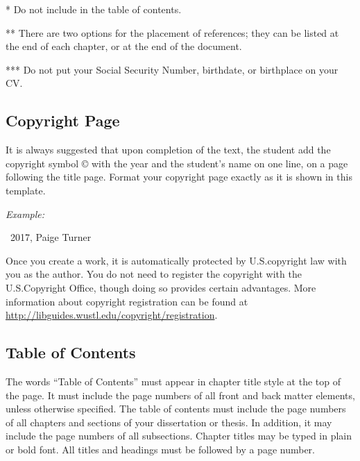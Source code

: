 \begin{table}
\begin{threeparttable}[b]
  \vspace{.5em}
  \begin{tablenotes}
    \footnotesize
    \item[*] Do not include in the table of contents.
    \item[**] There are two options for the placement of references; they can be listed at the end of each chapter, or at the end of the document.
    \item[***] Do not put your Social Security Number, birthdate, or birthplace on your CV.
  \end{tablenotes}
  \end{threeparttable}
\end{table}

\subsection{Copyright Page}

It is always suggested that upon completion of the text, the student add the copyright symbol © with the year and the student's name on one line, on a page following the title page.
Format your copyright page exactly as it is shown in this template.

\vspace{\onelineskip}
\noindent
\textit{Example:}

\centerline{\textcopyright\ 2017, Paige Turner}
\vspace{\onelineskip}

Once you create a work, it is automatically protected by U.S.\@ copyright law with you as the author.
You do not need to register the copyright with the U.S.\@ Copyright Office, though doing so provides certain advantages.
More information about copyright registration can be found at \href{http://libguides.wustl.edu/copyright/registration}{http://libguides.wustl.edu/copyright/registration}.

\subsection{Table of Contents}

The words ``Table of Contents'' must appear in chapter title style at the top of the page.
It must include the page numbers of all front and back matter elements, unless otherwise specified.
The table of contents must include the page numbers of all chapters and sections of your dissertation or thesis.
In addition, it may include the page numbers of all subsections.
Chapter titles may be typed in plain or bold font.
All titles and headings must be followed by a page number.

